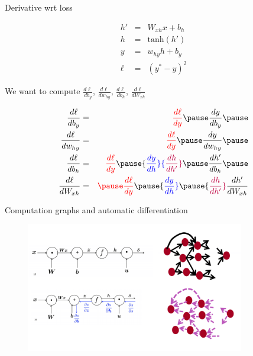 \begin{frame}[shrink=5]{Derivative wrt loss}
\begin{block}{}
	\begin{eqnarray*}
		h' &=& W_{xh} x + b_h \\
		h &=& \text{tanh}(h') \\
		y &=& w_{hy} h + b_y \\
		\ell &=& (y^\ast - y)^2
	\end{eqnarray*}
	
	We want to compute $\frac{d \ell}{d b_y}$, $\frac{d \ell}{d w_{hy}}$, $\frac{d \ell}{d b_h}$, $\frac{d \ell}{d W_{xh}}$
\end{block}
\pause
\begin{block}{}
	\begin{eqnarray*}
		\frac{d \ell}{d b_y} &=& {\color{red} \frac{d \ell}{d y}} \pause \frac{d y}{d b_y} \pause \\
		\frac{d \ell}{d w_{hy}} &=& {\color{red} \frac{d \ell}{d y}} \pause \frac{d y}{d w_{hy}} \pause \\
		\frac{d \ell}{d b_h} &=& {\color{red} \frac{d \ell}{d y}} \pause {\color{blue} \frac{d y}{d h}} {\color{purple} \frac{d h}{d h'}} \pause \frac{d h'}{d b_h} \pause \\
		\frac{d \ell}{d W_{xh}} &=& {\color{red} \pause \frac{d \ell}{d y}} \pause {\color{blue} \frac{d y}{d h}} \pause {\color{purple} \frac{d h}{d h'}}\frac{d h'}{d W_{xh}} 
	\end{eqnarray*}
\end{block}

\end{frame}

\begin{frame}{Computation graphs and automatic differentiation}
\begin{figure}
\centering
\includegraphics[width=0.85\textwidth]{figures/ff/cg.png}
\end{figure}
\end{frame}


